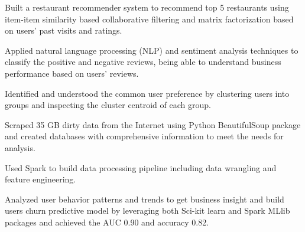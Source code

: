 \documentclass[letterpaper]{deedy-resume-openfont}
\begin{document}
\descript{}
\location{}
\begin{tightemize}
\item Built a restaurant recommender system to recommend top 5 restaurants using item-item similarity based collaborative filtering and matrix factorization based on users’ past visits and ratings.
\item Applied natural language processing (NLP) and sentiment analysis techniques to classify the positive and negative reviews, being able to understand business performance based on users' reviews.
\item Identified and understood the common user preference by clustering users into groups and inspecting the cluster centroid of each group.
\end{tightemize}
\sectionsep



 

\descript{}
\location{}
\begin{tightemize}
\item Scraped 35 GB dirty data from the Internet using Python BeautifulSoup package and created databases with comprehensive information to meet the needs for analysis.
\item Used Spark to build data processing pipeline including data wrangling and feature engineering.
\item Analyzed user behavior patterns and trends to get business insight and build users churn predictive model by leveraging both Sci-kit learn and Spark MLlib packages and achieved the AUC 0.90 and accuracy 0.82.
\end{tightemize}
\sectionsep
\end{document}
